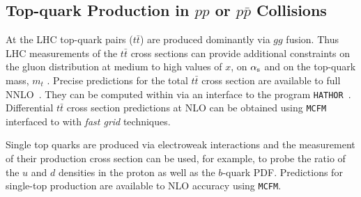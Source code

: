 \subsection{Top-quark Production in $pp$ or $p \bar p$ Collisions}

At the LHC top-quark pairs ($t \bar t$) are produced dominantly via $gg$ fusion.
Thus LHC measurements of the $t \bar t$ cross sections can provide additional 
constraints on the gluon distribution at medium to high values of $x$, 
on $\alpha_\mathrm{s}$ and on the top-quark mass, $m_t$ \cite{cms:top}. 
Precise predictions for the total $t \bar t$ cross section are available 
to full NNLO~\cite{Czakon:2013goa}. They can be computed within \fitter via an interface 
to the program \texttt{HATHOR}~\cite{Aliev:2010zk}. Differential $t \bar t$ cross section
predictions at NLO can be obtained using
\texttt{MCFM}~\cite{Campbell:2010ff,Campbell:2009ss,Campbell:2005bb,Campbell:2004ch,Campbell:2012uf} 
interfaced to \fitter with \emph{fast grid} techniques.

Single top quarks are produced via electroweak interactions and the measurement of their production cross section can be used, for example, to probe the ratio of the $u$ and $d$ densities in the proton 
as well as the $b$-quark PDF. Predictions 
for single-top production are available to NLO accuracy using \texttt{MCFM}.


%
